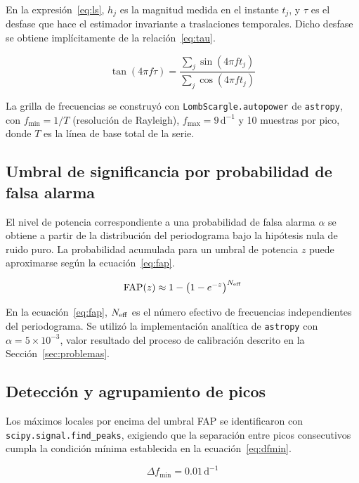 \documentclass[letterpaper,12pt]{extarticle}
\begin{document}
En la expresión~\ref{eq:ls}, $h_j$ es la magnitud medida en el instante $t_j$, y $\tau$ es el desfase que hace el estimador invariante a traslaciones temporales. Dicho desfase se obtiene implícitamente de la relación~\ref{eq:tau}.

\begin{equation}
    \tan(4\pi f\tau) = \frac{\displaystyle\sum_j \sin(4\pi f t_j)}{\displaystyle\sum_j \cos(4\pi f t_j)}
    \label{eq:tau}
\end{equation}

La grilla de frecuencias se construyó con \texttt{LombScargle.autopower} de \texttt{astropy}, con $f_{\min} = 1/T$ (resolución de Rayleigh), $f_{\max} = 9\,\mathrm{d}^{-1}$ y 10 muestras por pico, donde $T$ es la línea de base total de la serie.

\subsection{Umbral de significancia por probabilidad de falsa alarma}

El nivel de potencia correspondiente a una probabilidad de falsa alarma $\alpha$ se obtiene a partir de la distribución del periodograma bajo la hipótesis nula de ruido puro. La probabilidad acumulada para un umbral de potencia $z$ puede aproximarse según la ecuación~\ref{eq:fap}.

\begin{equation}
    \mathrm{FAP}(z) \approx 1 - \left(1 - e^{-z}\right)^{N_{\rm eff}}
    \label{eq:fap}
\end{equation}

En la ecuación~\ref{eq:fap}, $N_{\rm eff}$ es el número efectivo de frecuencias independientes del periodograma. Se utilizó la implementación analítica de \texttt{astropy} con $\alpha = 5\times10^{-3}$, valor resultado del proceso de calibración descrito en la Sección~\ref{sec:problemas}.

\subsection{Detección y agrupamiento de picos}

Los máximos locales por encima del umbral FAP se identificaron con \texttt{scipy.signal.find\_peaks}, exigiendo que la separación entre picos consecutivos cumpla la condición mínima establecida en la ecuación~\ref{eq:dfmin}.

\begin{equation}
    \Delta f_{\min} = 0.01\,\mathrm{d}^{-1}
    \label{eq:dfmin}
\end{equation}
\end{document}
